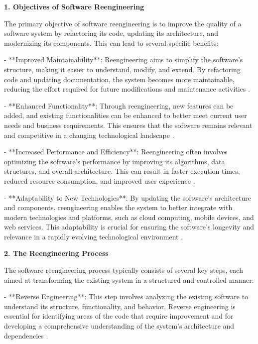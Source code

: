 \begin{refsection}
\textbf{1. Objectives of Software Reengineering}

The primary objective of software reengineering is to improve the quality of a software system by refactoring its code, updating its architecture, and modernizing its components. This can lead to several specific benefits:

- **Improved Maintainability**: Reengineering aims to simplify the software's structure, making it easier to understand, modify, and extend. By refactoring code and updating documentation, the system becomes more maintainable, reducing the effort required for future modifications and maintenance activities \cite[pp.~13-15]{chikofsky1990reverse}.

- **Enhanced Functionality**: Through reengineering, new features can be added, and existing functionalities can be enhanced to better meet current user needs and business requirements. This ensures that the software remains relevant and competitive in a changing technological landscape \cite[pp.~23-25]{arnold1993software}.

- **Increased Performance and Efficiency**: Reengineering often involves optimizing the software's performance by improving its algorithms, data structures, and overall architecture. This can result in faster execution times, reduced resource consumption, and improved user experience \cite[pp.~654-655]{sommerville2016software}.

- **Adaptability to New Technologies**: By updating the software's architecture and components, reengineering enables the system to better integrate with modern technologies and platforms, such as cloud computing, mobile devices, and web services. This adaptability is crucial for ensuring the software's longevity and relevance in a rapidly evolving technological environment \cite[pp.~286-287]{arnold1993software}.

\textbf{2. The Reengineering Process}

The software reengineering process typically consists of several key steps, each aimed at transforming the existing system in a structured and controlled manner:

- **Reverse Engineering**: This step involves analyzing the existing software to understand its structure, functionality, and behavior. Reverse engineering is essential for identifying areas of the code that require improvement and for developing a comprehensive understanding of the system's architecture and dependencies \cite[pp.~15-17]{chikofsky1990reverse}.


\end{refsection}
